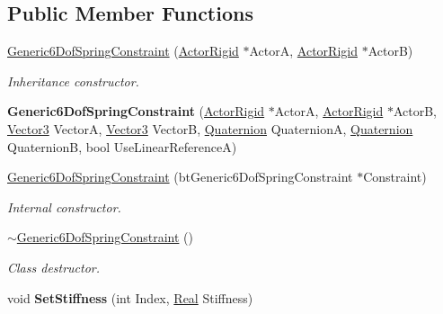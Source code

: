 \subsection*{Public Member Functions}
\begin{DoxyCompactItemize}
\item 
\hyperlink{classphys_1_1Generic6DofSpringConstraint_a88cf5bfb5db55b957652831c3295b56a}{Generic6DofSpringConstraint} (\hyperlink{classphys_1_1ActorRigid}{ActorRigid} $\ast$ActorA, \hyperlink{classphys_1_1ActorRigid}{ActorRigid} $\ast$ActorB)
\begin{DoxyCompactList}\small\item\em Inheritance constructor. \item\end{DoxyCompactList}\item 
\hypertarget{classphys_1_1Generic6DofSpringConstraint_afedaa8d86366f831bbde91e0825ae632}{
{\bfseries Generic6DofSpringConstraint} (\hyperlink{classphys_1_1ActorRigid}{ActorRigid} $\ast$ActorA, \hyperlink{classphys_1_1ActorRigid}{ActorRigid} $\ast$ActorB, \hyperlink{classphys_1_1Vector3}{Vector3} VectorA, \hyperlink{classphys_1_1Vector3}{Vector3} VectorB, \hyperlink{classphys_1_1Quaternion}{Quaternion} QuaternionA, \hyperlink{classphys_1_1Quaternion}{Quaternion} QuaternionB, bool UseLinearReferenceA)}
\label{d1/dc7/classphys_1_1Generic6DofSpringConstraint_afedaa8d86366f831bbde91e0825ae632}

\item 
\hyperlink{classphys_1_1Generic6DofSpringConstraint_aecd43f6209799587aacee584d3840491}{Generic6DofSpringConstraint} (btGeneric6DofSpringConstraint $\ast$Constraint)
\begin{DoxyCompactList}\small\item\em Internal constructor. \item\end{DoxyCompactList}\item 
\hyperlink{classphys_1_1Generic6DofSpringConstraint_a245aa769d0b19ff01acf77e78e959cad}{$\sim$Generic6DofSpringConstraint} ()
\begin{DoxyCompactList}\small\item\em Class destructor. \item\end{DoxyCompactList}\item 
\hypertarget{classphys_1_1Generic6DofSpringConstraint_a44b8d8d1616251d09dfe61ecc2f84a02}{
void {\bfseries SetStiffness} (int Index, \hyperlink{namespacephys_af7eb897198d265b8e868f45240230d5f}{Real} Stiffness)}
\label{d1/dc7/classphys_1_1Generic6DofSpringConstraint_a44b8d8d1616251d09dfe61ecc2f84a02}


\end{DoxyCompactItemize}
